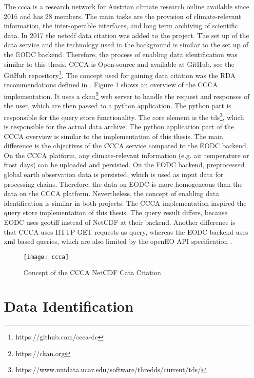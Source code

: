 \documentclass[draft,final]{vutinfth} %
\begin{document}
The \gls{ccca} is a research network for Austrian climate research online available since 2016 and has 28 members. The main tasks are the provision of climate-relevant information, the inter-operable interfaces, and long term archiving of scientific data. In 2017 the \gls{netcdf} data citation was added to the project. The set up of the data service and the technology used in the background is similar to the set up of the EODC backend. Therefore, the process of enabling data identification was similar to this thesis. CCCA is Open-source and available at GitHub, see the GitHub repository\footnote{https://github.com/ccca-dc}. The concept used for gaining data citation was the RDA recommendations defined in \cite{rauber2016identification}. Figure \ref{fig:ccca} shows an overview of the CCCA implementation. It uses a ckan\footnote{https://ckan.org} web server to handle the request and responses of the user, which are then passed to a python application. The python part is responsible for the query store functionality. The core element is the \gls{tds}\footnote{https://www.unidata.ucar.edu/software/thredds/current/tds/}, which is responsible for the actual data archive.   
The python application part of the CCCA overview is similar to the implementation of this thesis. The main difference is the objectives of the CCCA service compared to the EODC backend. On the CCCA platform, any climate-relevant information (e.g. air temperature or frost days) can be uploaded and persisted. On the EODC backend, preprocessed global earth observation data is persisted, which is used as input data for processing chains. Therefore, the data on EODC is more homogeneous than the data on the CCCA platform.
Nevertheless, the concept of enabling data identification is similar in both projects. The CCCA implementation inspired the query store implementation of this thesis. The query result differs, because EODC uses \gls{geotiff} instead of NetCDF at their backend. Another difference is that CCCA uses HTTP GET requests as query, whereas the EODC backend uses \gls{xml} based queries, which are also limited by the openEO API specification  \cite{ccca}.  

\begin{figure}[h]
	\centering
	\texttt{[image: ccca]}
	\caption{Concept of the CCCA NetCDF Cata Citation}
	\label{fig:ccca} %
\end{figure}

\section{Data Identification}\label{Data Identification}
\end{document}
